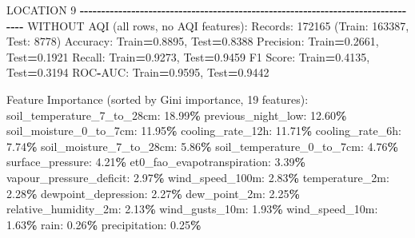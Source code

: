 \documentclass[
  letterpaper,
  DIV=11,
  numbers=noendperiod]{scrartcl}
\newenvironment{Shaded}{\begin{snugshade}}{\end{snugshade}}
\newcommand{\BuiltInTok}[1]{#1}
\newcommand{\DecValTok}[1]{\textcolor[rgb]{0.00,0.00,0.81}{#1}}
\newcommand{\FloatTok}[1]{\textcolor[rgb]{0.00,0.00,0.81}{#1}}
\newcommand{\NormalTok}[1]{#1}
\newcommand{\OperatorTok}[1]{\textcolor[rgb]{0.81,0.36,0.00}{\textbf{#1}}}
\begin{document}
\begin{Shaded}
\begin{Highlighting}[]
\NormalTok{LOCATION }\DecValTok{9}
\OperatorTok{{-}{-}{-}{-}{-}{-}{-}{-}{-}{-}{-}{-}{-}{-}{-}{-}{-}{-}{-}{-}{-}{-}{-}{-}{-}{-}{-}{-}{-}{-}{-}{-}{-}{-}{-}{-}{-}{-}{-}{-}{-}{-}{-}{-}{-}{-}{-}{-}{-}{-}{-}{-}{-}{-}{-}{-}{-}{-}{-}{-}{-}{-}{-}{-}{-}{-}{-}{-}{-}{-}{-}{-}{-}{-}{-}{-}{-}{-}{-}{-}}
\NormalTok{WITHOUT AQI (}\BuiltInTok{all}\NormalTok{ rows, no AQI features):}
\NormalTok{  Records: }\DecValTok{172165}\NormalTok{ (Train: }\DecValTok{163387}\NormalTok{, Test: }\DecValTok{8778}\NormalTok{)}
\NormalTok{  Accuracy: Train}\OperatorTok{=}\FloatTok{0.8895}\NormalTok{, Test}\OperatorTok{=}\FloatTok{0.8388}
\NormalTok{  Precision: Train}\OperatorTok{=}\FloatTok{0.2661}\NormalTok{, Test}\OperatorTok{=}\FloatTok{0.1921}
\NormalTok{  Recall: Train}\OperatorTok{=}\FloatTok{0.9273}\NormalTok{, Test}\OperatorTok{=}\FloatTok{0.9459}
\NormalTok{  F1 Score: Train}\OperatorTok{=}\FloatTok{0.4135}\NormalTok{, Test}\OperatorTok{=}\FloatTok{0.3194}
\NormalTok{  ROC}\OperatorTok{{-}}\NormalTok{AUC: Train}\OperatorTok{=}\FloatTok{0.9595}\NormalTok{, Test}\OperatorTok{=}\FloatTok{0.9442}

\NormalTok{  Feature Importance (}\BuiltInTok{sorted}\NormalTok{ by Gini importance, }\DecValTok{19}\NormalTok{ features):}
\NormalTok{    soil\_temperature\_7\_to\_28cm: }\FloatTok{18.99}\OperatorTok{\%}
\NormalTok{    previous\_night\_low: }\FloatTok{12.60}\OperatorTok{\%}
\NormalTok{    soil\_moisture\_0\_to\_7cm: }\FloatTok{11.95}\OperatorTok{\%}
\NormalTok{    cooling\_rate\_12h: }\FloatTok{11.71}\OperatorTok{\%}
\NormalTok{    cooling\_rate\_6h: }\FloatTok{7.74}\OperatorTok{\%}
\NormalTok{    soil\_moisture\_7\_to\_28cm: }\FloatTok{5.86}\OperatorTok{\%}
\NormalTok{    soil\_temperature\_0\_to\_7cm: }\FloatTok{4.76}\OperatorTok{\%}
\NormalTok{    surface\_pressure: }\FloatTok{4.21}\OperatorTok{\%}
\NormalTok{    et0\_fao\_evapotranspiration: }\FloatTok{3.39}\OperatorTok{\%}
\NormalTok{    vapour\_pressure\_deficit: }\FloatTok{2.97}\OperatorTok{\%}
\NormalTok{    wind\_speed\_100m: }\FloatTok{2.83}\OperatorTok{\%}
\NormalTok{    temperature\_2m: }\FloatTok{2.28}\OperatorTok{\%}
\NormalTok{    dewpoint\_depression: }\FloatTok{2.27}\OperatorTok{\%}
\NormalTok{    dew\_point\_2m: }\FloatTok{2.25}\OperatorTok{\%}
\NormalTok{    relative\_humidity\_2m: }\FloatTok{2.13}\OperatorTok{\%}
\NormalTok{    wind\_gusts\_10m: }\FloatTok{1.93}\OperatorTok{\%}
\NormalTok{    wind\_speed\_10m: }\FloatTok{1.63}\OperatorTok{\%}
\NormalTok{    rain: }\FloatTok{0.26}\OperatorTok{\%}
\NormalTok{    precipitation: }\FloatTok{0.25}\OperatorTok{\%}


\end{Highlighting}
\end{Shaded}
\end{document}
